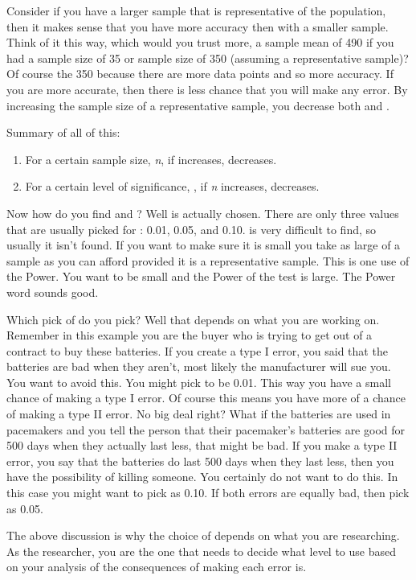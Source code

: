 \documentclass[]{book}
\begin{document}
Consider if you have a larger sample that is representative of the population, then it makes sense that you have more accuracy then with a smaller sample. Think of it this way, which would you trust more, a sample mean of 490 if you had a sample size of 35 or sample size of 350 (assuming a representative sample)? Of course the 350 because there are more data points and so more accuracy. If you are more accurate, then there is less chance that you will make any error. By increasing the sample size of a representative sample, you decrease both and .

Summary of all of this:

\begin{enumerate}
\def\labelenumi{\arabic{enumi}.}
\item
  For a certain sample size, \emph{n}, if increases, decreases.
\item
  For a certain level of significance, , if \emph{n} increases, decreases.
\end{enumerate}

Now how do you find and ? Well is actually chosen. There are only three values that are usually picked for : 0.01, 0.05, and 0.10. is very difficult to find, so usually it isn't found. If you want to make sure it is small you take as large of a sample as you can afford provided it is a representative sample. This is one use of the Power. You want to be small and the Power of the test is large. The Power word sounds good.

Which pick of do you pick? Well that depends on what you are working on. Remember in this example you are the buyer who is trying to get out of a contract to buy these batteries. If you create a type I error, you said that the batteries are bad when they aren't, most likely the manufacturer will sue you. You want to avoid this. You might pick to be 0.01. This way you have a small chance of making a type I error. Of course this means you have more of a chance of making a type II error. No big deal right? What if the batteries are used in pacemakers and you tell the person that their pacemaker's batteries are good for 500 days when they actually last less, that might be bad. If you make a type II error, you say that the batteries do last 500 days when they last less, then you have the possibility of killing someone. You certainly do not want to do this. In this case you might want to pick as 0.10. If both errors are equally bad, then pick as 0.05.

The above discussion is why the choice of depends on what you are researching. As the researcher, you are the one that needs to decide what level to use based on your analysis of the consequences of making each error is.
\end{document}
